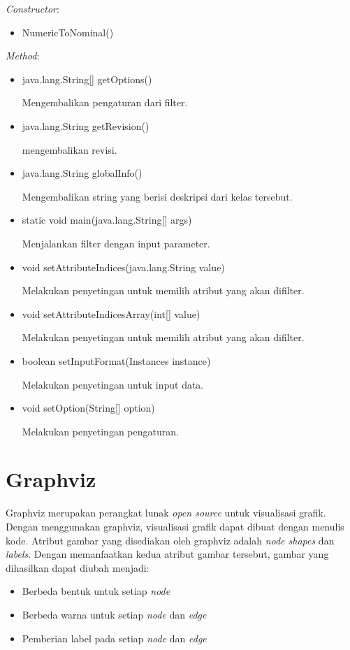 \textsl{Constructor}:
\begin{itemize}
	\item NumericToNominal()
\end{itemize}
\textsl{Method}:
\begin{itemize}
	
	\item java.lang.String[] getOptions()
	
	Mengembalikan pengaturan dari filter.
	
	\item java.lang.String getRevision()
	
	mengembalikan revisi.
	
	\item java.lang.String globalInfo()
	
	Mengembalikan string yang berisi deskripsi dari kelas tersebut.
	
	\item static void main(java.lang.String[] args)	
	
	Menjalankan filter dengan input parameter.
	
	\item void setAttributeIndices(java.lang.String value)
	
	Melakukan penyetingan untuk memilih atribut yang akan difilter.
	
	\item void setAttributeIndicesArray(int[] value)
	
	Melakukan penyetingan untuk memilih atribut yang akan difilter.
	
	\item boolean setInputFormat(Instances instance)
	
	Melakukan penyetingan untuk input data.
	
	\item void setOption(String[] option)
	
	Melakukan penyetingan pengaturan.
\end{itemize}

\section{Graphviz}
Graphviz merupakan perangkat lunak \textsl{open source} untuk visualisasi grafik. Dengan menggunakan graphviz, visualisasi grafik dapat dibuat dengan menulis kode. Atribut gambar yang disediakan oleh graphviz adalah \textsl{node shapes} dan \textsl{labels}. Dengan memanfaatkan kedua atribut gambar tersebut, gambar yang dihasilkan dapat diubah menjadi:
\begin{itemize}
	\item Berbeda bentuk untuk setiap \textsl{node}
	\item Berbeda warna untuk setiap \textsl{node} dan \textsl{edge}
	\item Pemberian label pada setiap \textsl{node} dan \textsl{edge}
\end{itemize}

